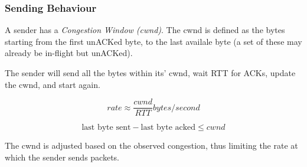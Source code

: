 \subsubsection{Sending Behaviour}

A sender has a \textit{Congestion Window (cwnd)}. The cwnd is defined
as the bytes starting from the first unACKed byte, to the last availale byte
(a set of these may already be in-flight but unACKed).

The sender will send all the bytes within its' cwnd, wait RTT for ACKs, update the cwnd, and start again.

\begin{equation}
    rate \approx \frac{cwnd}{RTT}bytes / second
\end{equation}

\begin{equation}
    \textrm{last byte sent} - \textrm{last byte acked} \leq cwnd
\end{equation}

The cwnd is adjusted based on the observed congestion, thus limiting the rate
at which the sender sends packets.